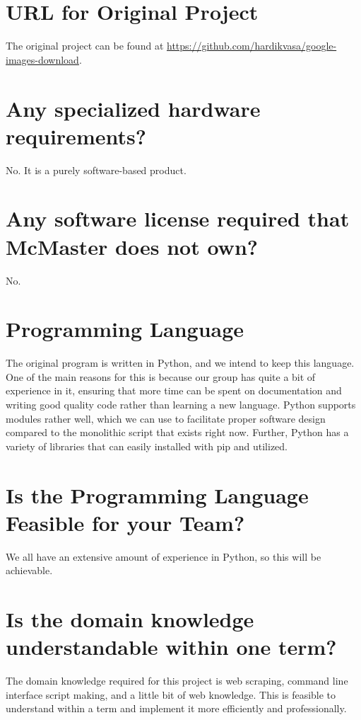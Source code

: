 \documentclass[12pt]{article}
\begin{document}
\section* {URL for Original Project}

The original project can be found at \url{https://github.com/hardikvasa/google-images-download}.

\section* {Any specialized hardware requirements?}

No. It is a purely software-based product.

\section* {Any software license required that McMaster does not own?}

No. 

\section* {Programming Language}

The original program is written in Python, and we intend to keep this language. One of the main reasons for this is because our group has quite a bit of experience in it, ensuring that more time can be spent on documentation and writing good quality code rather than learning a new language. Python supports modules rather well, which we can use to facilitate proper software design compared to the monolithic script that exists right now. Further, Python has a variety of libraries that can easily installed with pip and utilized.

\section* {Is the Programming Language Feasible for your Team?}

We all have an extensive amount of experience in Python, so this will be achievable.

\section* {Is the domain knowledge understandable within one term?}

The domain knowledge required for this project is web scraping, command line interface script making, and a little bit of web knowledge. This is feasible to understand within a term and implement it more efficiently and professionally.
\end{document}
